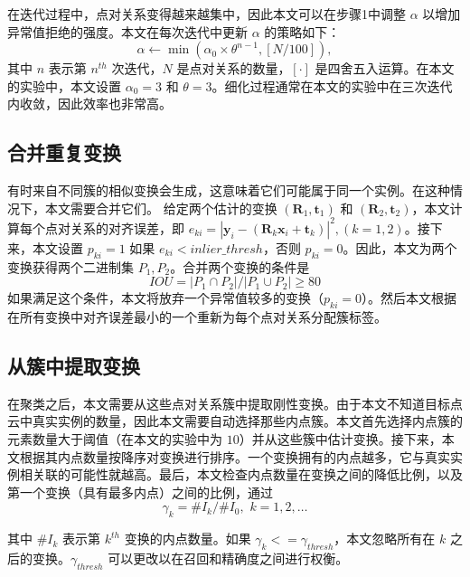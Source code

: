 在迭代过程中，点对关系变得越来越集中，因此本文可以在步骤1中调整 $\alpha$ 以增加异常值拒绝的强度。本文在每次迭代中更新 $\alpha$ 的策略如下：
\begin{equation}
\alpha \leftarrow \min(\alpha _0\times \theta ^{n-1},\left[N/100 \right] ),
\label{eq:alpha}
\end{equation}
其中 $n$ 表示第 $n^{th}$ 次迭代，$N$ 是点对关系的数量，$\left[ \cdot \right]$ 是四舍五入运算。在本文的实验中，本文设置 $\alpha_0 = 3$ 和 $\theta = 3$。细化过程通常在本文的实验中在三次迭代内收敛，因此效率也非常高。

\subsection{合并重复变换}
有时来自不同簇的相似变换会生成，这意味着它们可能属于同一个实例。在这种情况下，本文需要合并它们。
给定两个估计的变换 $(\boldsymbol{R}_1, \boldsymbol{t}_1)$ 和 $(\boldsymbol{R}_2, \boldsymbol{t}_2)$，本文计算每个点对关系的对齐误差，即 $e_{ki} = |\boldsymbol{y}_{i}-(\boldsymbol{R}_k \boldsymbol{x}_{i} + \boldsymbol{t}_k)|^2, (k = 1,2)$。接下来，本文设置 $p_{ki} = 1$ 如果 $e_{ki} < inlier\_thresh$，否则 $p_{ki}=0$。因此，本文为两个变换获得两个二进制集 $P_1, P_2$。合并两个变换的条件是
\begin{equation}
IOU = |P_1 \cap P_2|/|P_1 \cup P_2| \geq 80%
\label{eq:iou}
\end{equation}
如果满足这个条件，本文将放弃一个异常值较多的变换（$p_{ki} = 0$）。然后本文根据在所有变换中对齐误差最小的一个重新为每个点对关系分配簇标签。

\subsection{从簇中提取变换}
在聚类之后，本文需要从这些点对关系簇中提取刚性变换。由于本文不知道目标点云中真实实例的数量，因此本文需要自动选择那些内点簇。本文首先选择内点簇的元素数量大于阈值（在本文的实验中为 $10$）并从这些簇中估计变换。接下来，本文根据其内点数量按降序对变换进行排序。一个变换拥有的内点越多，它与真实实例相关联的可能性就越高。最后，本文检查内点数量在变换之间的降低比例，以及第一个变换（具有最多内点）之间的比例，通过
\begin{equation}
    \gamma_k = \#I_{k}/\#I_{0},\,\, k = 1,2,\ldots
\end{equation}

其中 $\#I_k$ 表示第 $k^{th}$ 变换的内点数量。如果 $\gamma_k <= \gamma_{thresh}$，本文忽略所有在 $k$ 之后的变换。$\gamma_{thresh}$ 可以更改以在召回和精确度之间进行权衡。

